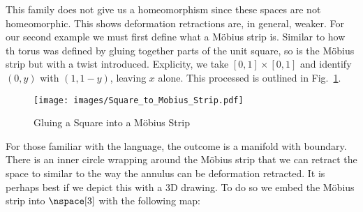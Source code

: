 \documentclass{book}                                                           %
\begin{document}
                \par
                \begin{minipage}[t]{0.50\textwidth}
                    This family does not give us a homeomorphism since these
                    spaces are not homeomorphic. This shows deformation
                    retractions are, in general, weaker. For our second example
                    we must first define what a M\"{o}bius strip is. Similar to
                    how th torus was defined by gluing together parts
                    of the unit square, so is the M\"{o}bius strip but with a
                    twist introduced. Explicity, we take $[0,1]\times[0,1]$ and
                    identify $(0,y)$ with $(1,1-y)$, leaving $x$ alone. This
                    processed is outlined in
                    Fig.~\ref{fig:Square_to_Mobius_Strip}.
                \end{minipage}
                \hfill
                \par\vspace{2.5ex}
                \begin{figure}
                    \centering
                    \captionsetup{type=figure}
                    \texttt{[image: images/Square\_to\_Mobius\_Strip.pdf]}
                    \caption{Gluing a Square into a M\"{o}bius Strip}
                    \label{fig:Square_to_Mobius_Strip}
                \end{figure}
                For those familiar with the language, the outcome is a manifold
                with boundary. There is an inner circle wrapping around the
                M\"{o}bius strip that we can retract the space to similar to the
                way the annulus can be deformation retracted. It is perhaps best
                if we depict this with a 3D drawing. To do so we embed the
                M\"{o}bius strip into $\nspace[3]$ with the following map:
\end{document}

